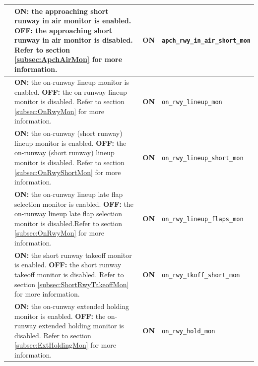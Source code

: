 \documentclass[a4paper,12pt]{article}
\newcommand{\confopt}[1]{\texttt{#1}}
\begin{document}
{\begin{center}
\begin{supertabular}{|c|p{8cm}|c|l|}
\hline

 &
\textbf{ON:} the approaching short runway in air monitor is enabled.\newline
\textbf{OFF:} the approaching short runway in air monitor is disabled.\newline
Refer to section \ref{subsec:ApchAirMon} for more information. & \textbf{ON} &
\confopt{apch\_rwy\_in\_air\_short\_mon} \\

\hline

 &
\textbf{ON:} the on-runway lineup monitor is enabled.\newline
\textbf{OFF:} the on-runway lineup monitor is disabled.\newline
Refer to section \ref{subsec:OnRwyMon} for more information. &
\textbf{ON} & \confopt{on\_rwy\_lineup\_mon} \\

\hline

 &
\textbf{ON:} the on-runway (short runway) lineup monitor is enabled.\newline
\textbf{OFF:} the on-runway (short runway) lineup monitor is disabled.\newline
Refer to section \ref{subsec:OnRwyShortMon} for more information. &
\textbf{ON} & \confopt{on\_rwy\_lineup\_short\_mon} \\

\hline

 &
\textbf{ON:} the on-runway lineup late flap selection monitor is
enabled.\newline
\textbf{OFF:} the on-runway lineup late flap selection monitor is
disabled.\newline Refer to section \ref{subsec:OnRwyMon} for more
information. & \textbf{ON} & \confopt{on\_rwy\_lineup\_flaps\_mon} \\

\hline

 &
\textbf{ON:} the short runway takeoff monitor is enabled.\newline
\textbf{OFF:} the short runway takeoff monitor is disabled.\newline
Refer to section \ref{subsec:ShortRwyTakeoffMon} for more information. &
\textbf{ON} & \confopt{on\_rwy\_tkoff\_short\_mon} \\

\hline

 &
\textbf{ON:} the on-runway extended holding monitor is enabled.\newline
\textbf{OFF:} the on-runway extended holding monitor is disabled.\newline
Refer to section \ref{subsec:ExtHoldingMon} for more information. &
\textbf{ON} & \confopt{on\_rwy\_hold\_mon} \\


\end{supertabular}
\end{center}}
\end{document}
